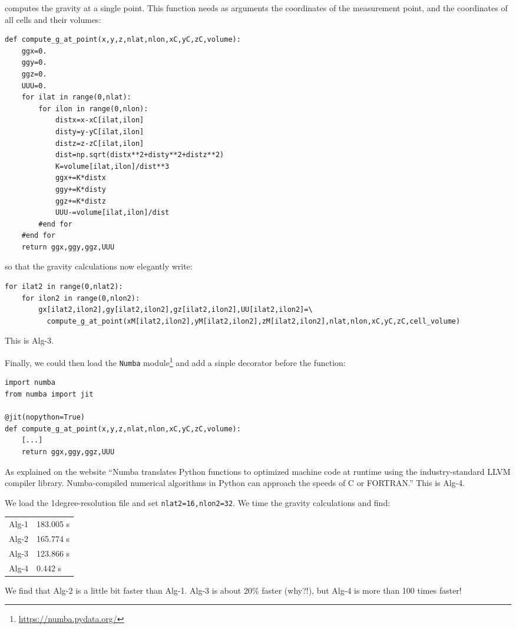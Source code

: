 computes the gravity at a single point. This function needs as arguments the coordinates
of the measurement point, and the coordinates of all cells and their volumes:
\begin{lstlisting}
def compute_g_at_point(x,y,z,nlat,nlon,xC,yC,zC,volume):
    ggx=0.
    ggy=0.
    ggz=0.
    UUU=0.
    for ilat in range(0,nlat):
        for ilon in range(0,nlon):
            distx=x-xC[ilat,ilon]
            disty=y-yC[ilat,ilon]
            distz=z-zC[ilat,ilon]
            dist=np.sqrt(distx**2+disty**2+distz**2)
            K=volume[ilat,ilon]/dist**3
            ggx+=K*distx
            ggy+=K*disty
            ggz+=K*distz
            UUU-=volume[ilat,ilon]/dist
        #end for
    #end for
    return ggx,ggy,ggz,UUU
\end{lstlisting}
so that the gravity calculations now elegantly write:
\begin{lstlisting}
for ilat2 in range(0,nlat2):
    for ilon2 in range(0,nlon2): 
        gx[ilat2,ilon2],gy[ilat2,ilon2],gz[ilat2,ilon2],UU[ilat2,ilon2]=\
          compute_g_at_point(xM[ilat2,ilon2],yM[ilat2,ilon2],zM[ilat2,ilon2],nlat,nlon,xC,yC,zC,cell_volume)
\end{lstlisting}
This is Alg-3.

Finally, we could then load the \lstinline{Numba} module\footnote{\url{https://numba.pydata.org/}} 
and add a sinple decorator before the 
function:
\begin{lstlisting}
import numba
from numba import jit

@jit(nopython=True)
def compute_g_at_point(x,y,z,nlat,nlon,xC,yC,zC,volume):
    [...]
    return ggx,ggy,ggz,UUU
\end{lstlisting}
As explained on the website ``Numba translates Python functions to optimized machine code at runtime using 
the industry-standard LLVM compiler library. Numba-compiled numerical algorithms in Python 
can approach the speeds of C or FORTRAN.''
This is Alg-4.

We load the 1degree-resolution file and set \lstinline{nlat2=16,nlon2=32}. We time the 
gravity calculations and find:
\begin{center}
\begin{tabular}{ll}
\hline
Alg-1 & 183.005 s \\
Alg-2 & 165.774 s \\ 
Alg-3 & 123.866 s \\
Alg-4 & 0.442 s \\
\hline
\end{tabular}
\end{center}
We find that Alg-2 is a little bit faster than Alg-1. Alg-3 is about 20\% faster (why?!), 
but Alg-4 is more than 100 times faster!  

